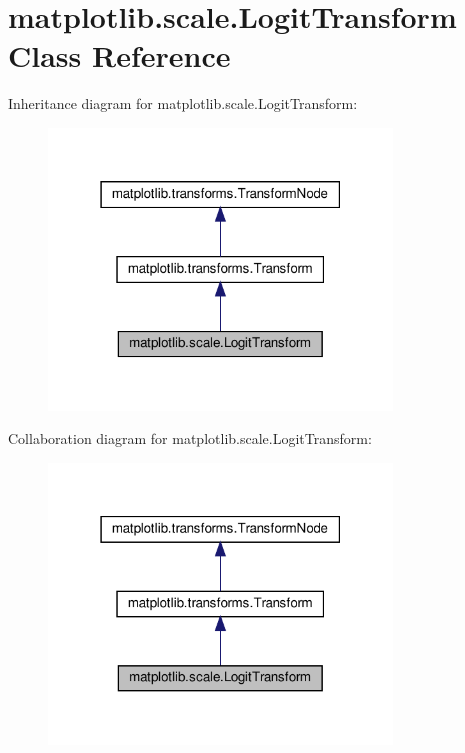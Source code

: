 \hypertarget{classmatplotlib_1_1scale_1_1LogitTransform}{}\section{matplotlib.\+scale.\+Logit\+Transform Class Reference}
\label{classmatplotlib_1_1scale_1_1LogitTransform}


Inheritance diagram for matplotlib.\+scale.\+Logit\+Transform\+:
\nopagebreak
\begin{figure}[H]
\begin{center}
\leavevmode
\includegraphics[width=259pt]{classmatplotlib_1_1scale_1_1LogitTransform__inherit__graph}
\end{center}
\end{figure}


Collaboration diagram for matplotlib.\+scale.\+Logit\+Transform\+:
\nopagebreak
\begin{figure}[H]
\begin{center}
\leavevmode
\includegraphics[width=259pt]{classmatplotlib_1_1scale_1_1LogitTransform__coll__graph}
\end{center}
\end{figure}
